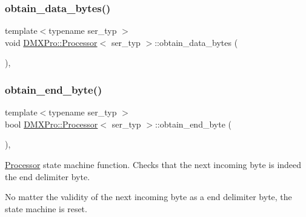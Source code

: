 \mbox{\label{classDMXPro_1_1Processor_a1170e4aae92ed4bf740020e13602e648}} 
\subsubsection{\texorpdfstring{obtain\+\_\+data\+\_\+bytes()}{obtain\_data\_bytes()}}
{\footnotesize\ttfamily template$<$typename ser\+\_\+typ $>$ \\
void \hyperlink{classDMXPro_1_1Processor}{D\+M\+X\+Pro\+::\+Processor}$<$ ser\+\_\+typ $>$\+::obtain\+\_\+data\+\_\+bytes (\begin{DoxyParamCaption}{ }\end{DoxyParamCaption})\hspace{0.3cm}{\ttfamily [inline]}, {\ttfamily [private]}}

\mbox{\label{classDMXPro_1_1Processor_ad8895162387072e0c5c44101f516b351}} 
\subsubsection{\texorpdfstring{obtain\+\_\+end\+\_\+byte()}{obtain\_end\_byte()}}
{\footnotesize\ttfamily template$<$typename ser\+\_\+typ $>$ \\
bool \hyperlink{classDMXPro_1_1Processor}{D\+M\+X\+Pro\+::\+Processor}$<$ ser\+\_\+typ $>$\+::obtain\+\_\+end\+\_\+byte (\begin{DoxyParamCaption}{ }\end{DoxyParamCaption})\hspace{0.3cm}{\ttfamily [inline]}, {\ttfamily [private]}}



\hyperlink{classDMXPro_1_1Processor}{Processor} state machine function. Checks that the next incoming byte is indeed the end delimiter byte. 

No matter the validity of the next incoming byte as a end delimiter byte, the state machine is reset.

